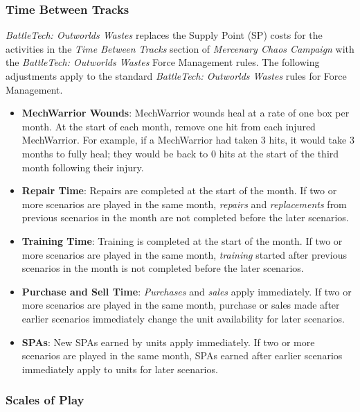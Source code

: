 \subsubsection{Time Between Tracks}

\emph{BattleTech: Outworlds Wastes} replaces the Supply Point (SP) costs for the activities in the \emph{Time Between Tracks} section of \emph{Mercenary Chaos Campaign} with the \emph{BattleTech: Outworlds Wastes} Force Management rules.
The following adjustments apply to the standard \emph{BattleTech: Outworlds Wastes} rules for Force Management.

\begin{itemize}

\item {\bfseries MechWarrior Wounds}: MechWarrior wounds heal at a rate of one box per month.
At the start of each month, remove one hit from each injured MechWarrior.
For example, if a MechWarrior had taken 3 hits, it would take 3 months to fully heal; they would be back to 0 hits at the start of the third month following their injury.

\item {\bfseries Repair Time}: Repairs are completed at the start of the month.
If two or more scenarios are played in the same month, \emph{repairs} and \emph{replacements} from previous scenarios in the month are not completed before the later scenarios.

\item {\bfseries Training Time}: Training is completed at the start of the month.
If two or more scenarios are played in the same month, \emph{training} started after previous scenarios in the month is not completed before the later scenarios.

\item {\bfseries Purchase and Sell Time}: \emph{Purchases} and \emph{sales} apply immediately.
If two or more scenarios are played in the same month, purchase or sales made after earlier scenarios immediately change the unit availability for later scenarios.

\item {\bfseries SPAs}: New SPAs earned by units apply immediately.
If two or more scenarios are played in the same month, SPAs earned after earlier scenarios immediately apply to units for later scenarios.

\end{itemize}

\subsubsection{Scales of Play}


